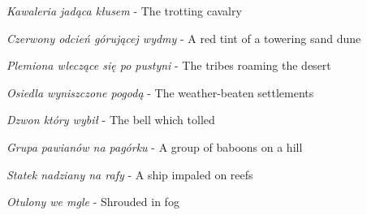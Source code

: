 \documentclass[a4paper]{article}
\begin{document}
\emph{Kawaleria jadąca kłusem} - The trotting cavalry

\emph{Czerwony odcień górującej wydmy} - A red tint of a towering sand dune

\emph{Plemiona wleczące się po pustyni} - The tribes roaming the desert

\emph{Osiedla wyniszczone pogodą} - The weather-beaten settlements

\emph{Dzwon który wybił} - The bell which tolled

\emph{Grupa pawianów na pagórku} - A group of baboons on a hill

\emph{Statek nadziany na rafy} - A ship impaled on reefs

\emph{Otulony we mgle} - Shrouded in fog
\end{document}
